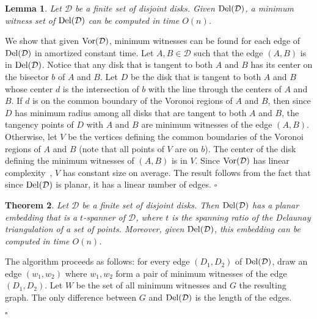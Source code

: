 \documentclass[pdftex,leqno,fleqn,12pt]{article}
\newcommand{\DEL}{{\rm{Del}}}
\newcommand{\VOR}{{\rm{Vor}}}
\newtheorem{theorem}{Theorem}[section]
\newtheorem{lemma}[theorem]{Lemma}
\newenvironment{proof}{{\textit Proof:} \rm}{\hfill $\square$ \medskip\\}
\begin{document}
{\begin{lemma} Let $\mathcal{D}$ be a finite set of disjoint disks. Given $\DEL(\mathcal{D})$,
a minimum witness set of $\DEL(\mathcal{D})$ can be computed in time $O(n)$.
\end{lemma}
\begin{proof}
We show that given $\VOR(\mathcal{D})$, minimum witnesses can be found for each edge of
$\DEL(\mathcal{D})$ in amortized constant time. Let $A,B\in \mathcal{D}$ such that the edge $(A,B)$
is in $\DEL(\mathcal{D})$. Notice that any disk that is tangent to both $A$ and $B$ has its center
on the bisector $b$ of $A$ and $B$. Let $D$ be the disk that is tangent to both $A$ and $B$ whose
center $d$ is the intersection of $b$ with the line through the centers of $A$ and $B$. If $d$ is
on the common boundary of the Voronoi regions of $A$ and $B$, then since $D$ has minimum radius
among all disks that are tangent to both $A$ and $B$, the tangency points of $D$ with $A$ and $B$
are minimum witnesses of the edge $(A,B)$. Otherwise, let $V$ be the vertices defining the common
boundaries of the Voronoi regions of $A$ and $B$ (note that all points of $V$ are on $b$). The
center of the disk defining the minimum witnesses of $(A,B)$ is in $V$. Since $\VOR(\mathcal{D})$
has linear complexity~\cite{fortune87}, $V$ has constant size on average. The result follows from
the fact that since $\DEL(\mathcal{D})$ is planar, it has a linear number of edges.
\end{proof}

\begin{theorem}\label{reverse-prop} Let $\mathcal{D}$ be a finite set of disjoint disks.
Then $\DEL(\mathcal{D})$ has a planar embedding that is a $t$-spanner of $\mathcal{D}$, where $t$
is the spanning ratio of the Delaunay triangulation of a set of points. Moreover, given
$\DEL(\mathcal{D})$, this embedding can be computed in time $O(n)$.
\end{theorem}
\begin{proof} The algorithm proceeds as follows: for every edge $(D_1,D_2)$ of $\DEL(\mathcal{D})$,
draw an edge $(w_1,w_2)$ where $w_1,w_2$ form a pair of minimum witnesses of the edge $(D_1,D_2)$.
Let $W$ be the set of all minimum witnesses and $G$ the resulting graph. The only difference
between $G$ and $\DEL(\mathcal{D})$ is the length of the edges.


\end{proof}}
\end{document}
